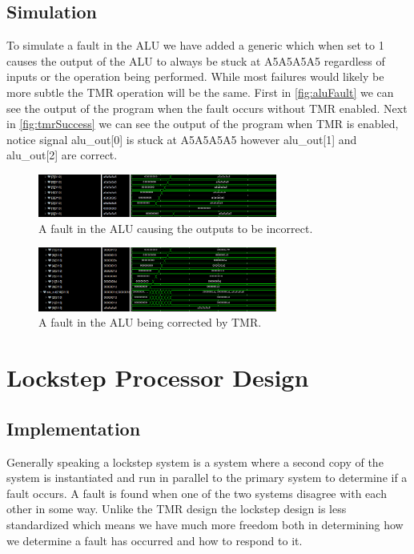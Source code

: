 \documentclass[12pt]{article}
\begin{document}
\subsection{Simulation}
To simulate a fault in the ALU we have added a generic which when set to 1 causes the output of the ALU to always be stuck at A5A5A5A5 regardless of inputs or the operation being performed. While most failures would likely be more subtle the TMR operation will be the same. First in \autoref{fig:aluFault} we can see the output of the program when the fault occurs without TMR enabled. Next in \autoref{fig:tmrSuccess} we can see the output of the program when TMR is enabled, notice signal alu\_out[0] is stuck at A5A5A5A5 however alu\_out[1] and alu\_out[2] are correct.

\begin{figure}[H]
    \centering
    \includegraphics[width=0.7\textwidth]{aluFault.PNG}
    \caption{A fault in the ALU causing the outputs to be incorrect.}
    \label{fig:aluFault}
\end{figure}

\begin{figure}[H]
    \centering
    \includegraphics[width=0.7\textwidth]{tmrSuccess.PNG}
    \caption{A fault in the ALU being corrected by TMR.}
    \label{fig:tmrSuccess}
\end{figure}

\section{Lockstep Processor Design}
\subsection{Implementation}
Generally speaking a lockstep system is a system where a second copy of the system is instantiated and run in parallel to the primary system to determine if a fault occurs. A fault is found when one of the two systems disagree with each other in some way. Unlike the TMR design the lockstep design is less standardized which means we have much more freedom both in determining how we determine a fault has occurred and how to respond to it.
\end{document}
